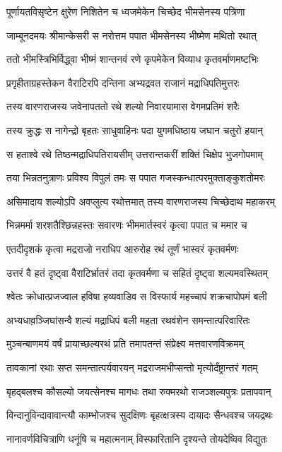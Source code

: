\twolineshloka
{पूर्णायतविसृष्टेन क्षुरेण निशितेन च}
{ध्वजमेकेन चिच्छेद भीमसेनस्य पत्रिणा}


\twolineshloka
{जाम्बूनदमयः श्रीमान्केसरी स नरोत्तम}
{पपात भीमसेनस्य भीष्मेण मथितो रथात्}


\twolineshloka
{ततो भीमस्त्रिभिर्विद्ध्वा भीष्मं शान्तनवं रणे}
{कृपमेकेन विव्याध कृतवर्माणमष्टभिः}


\twolineshloka
{प्रगृहीताग्रहस्तेकन वैराटिरपि दन्तिना}
{अभ्यद्रवत राजानं मद्राधिपतिमुत्तरः}


\threelineshloka
{तस्य वारणराजस्य जवेनापततो रथे}
{शल्यो निवारयामास वेगमप्रतिमं शरैः}
{}


\twolineshloka
{तस्य क्रुद्धः स नागेन्द्रो बृहतः साधुवाहिनः}
{पदा युगमधिष्ठाय जघान चतुरो हयान्}


\twolineshloka
{स हताश्वे रथे तिष्ठन्मद्राधिपतिरायसीम्}
{उत्तरान्तकरीं शक्तिं चिक्षेप भुजगोपमाम्}


\twolineshloka
{तया भिन्नतनुत्राणः प्रविश्य विपुलं तमः}
{स पपात गजस्कन्धात्परमुक्ताङ्कुशतोमरः}


\twolineshloka
{असिमादाय शल्योऽपि अवप्लुत्य रथोत्तमात्}
{तस्य वारणराजस्य चिच्छेदाथ महाकरम्}


\twolineshloka
{भिन्नमर्मा शरशतैश्छिन्नहस्तः सवारणः}
{भीममार्तस्वरं कृत्वा पपात च ममार च}


\twolineshloka
{एतदीदृशकं कृत्वा मद्रराजो नराधिप}
{आरुरोह रथं तूर्णं भास्वरं कृतवर्मणः}


\twolineshloka
{उत्तरं वै हतं दृष्ट्वा वैराटिर्भ्रातरं तदा}
{कृतवर्मणा च सहितं दृष्ट्वा शल्यमवस्थितम्}


\twolineshloka
{श्वेतः क्रोधात्प्रजज्वाल हविषा हव्यवाडिव}
{स विस्फार्य महच्चापं शक्रचापोपमं बली}


\twolineshloka
{अभ्यधाव़ञ्जिघांसन्वै शल्यं मद्राधिपं बली}
{महता रथवंशेन समन्तात्परिवारितः}


\twolineshloka
{मुञ्चन्बाणमयं वर्षं प्रायाच्छल्यरथं प्रति}
{तमापतन्तं संप्रेक्ष्य मत्तवारणविक्रमम्}


\twolineshloka
{तावकानां रथाः सप्त समन्तात्पर्यवारयन्}
{मद्रराजमभीप्सन्तो मृत्योर्दंष्ट्रान्तरं गतम्}


\twolineshloka
{बृहद्बलश्च कौसल्यो जयत्सेनश्च मागधः}
{तथा रुक्मरथो राजञ्शल्यपुत्रः प्रतापवान्}


\twolineshloka
{विन्दानुविन्दावावान्त्यौ काम्भोजश्च सुदक्षिणः}
{बृहत्क्षत्रस्य दायादः सैन्धवश्च जयद्रथः}


\twolineshloka
{नानावर्णविचित्राणि धनूंषि च महात्मनाम्}
{विस्फारितानि दृश्यन्ते तोयदेष्विव विद्युतः}


